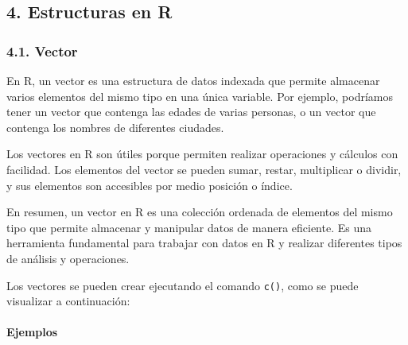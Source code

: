 \documentclass[
]{article}
\begin{document}
\subsection{4. Estructuras en R}\label{estructuras-en-r}

\subsubsection{4.1. Vector}\label{vector}

En R, un vector es una estructura de datos indexada que permite
almacenar varios elementos del mismo tipo en una única variable. Por
ejemplo, podríamos tener un vector que contenga las edades de varias
personas, o un vector que contenga los nombres de diferentes ciudades.

Los vectores en R son útiles porque permiten realizar operaciones y
cálculos con facilidad. Los elementos del vector se pueden sumar,
restar, multiplicar o dividir, y sus elementos son accesibles por medio
posición o índice.

En resumen, un vector en R es una colección ordenada de elementos del
mismo tipo que permite almacenar y manipular datos de manera eficiente.
Es una herramienta fundamental para trabajar con datos en R y realizar
diferentes tipos de análisis y operaciones.

Los vectores se pueden crear ejecutando el comando \texttt{c()}, como se
puede visualizar a continuación:

\paragraph{Ejemplos}\label{ejemplos}
\end{document}
